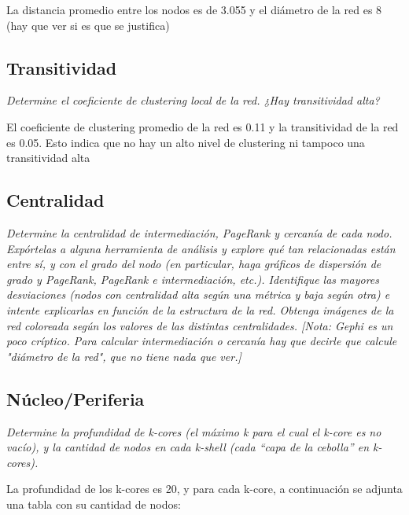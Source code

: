 \documentclass[12pt]{article}
\begin{document}
La distancia promedio entre los nodos es de 3.055 y el diámetro de la red es 8
(hay que ver si es que se justifica)


\subsection{Transitividad} 
\textit{Determine el coeficiente de clustering local de la red. ¿Hay transitividad alta?}

El coeficiente de clustering promedio de la red es  0.11 y la transitividad de la red es 0.05. Esto indica que no hay un alto nivel de clustering ni tampoco una transitividad alta


\subsection{Centralidad}  
\textit{Determine la centralidad de intermediación, PageRank y cercanía de cada nodo. Expórtelas a alguna herramienta de análisis y explore qué tan relacionadas están entre sí, y con el grado del nodo (en particular, haga gráficos de dispersión de grado y PageRank, PageRank e intermediación, etc.). Identifique las mayores desviaciones (nodos con centralidad alta según una métrica y baja según otra) e intente explicarlas en función de la estructura de la red. Obtenga imágenes de la red coloreada según los valores de las distintas centralidades. [Nota: Gephi es un poco críptico. Para calcular intermediación o cercanía hay que decirle que calcule "diámetro de la red", que no tiene nada que ver.]}

\subsection{Núcleo/Periferia}
\textit{Determine la profundidad de k-cores (el máximo k para el cual el k-core es no vacío), y la cantidad de nodos en cada k-shell (cada “capa de la cebolla” en k-cores).}

La profundidad de los k-cores es 20, y para cada k-core, a continuación se adjunta una tabla con su cantidad de nodos:
\end{document}
